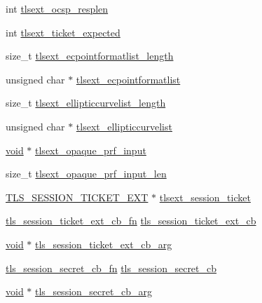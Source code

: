 \begin{DoxyCompactItemize}
\item 
int \hyperlink{structssl__st_a468160b672652db37243c0c954d9cfba}{tlsext\+\_\+ocsp\+\_\+resplen}
\item 
int \hyperlink{structssl__st_ade29ff7dfa991a7a99efa0964a1115cb}{tlsext\+\_\+ticket\+\_\+expected}
\item 
size\+\_\+t \hyperlink{structssl__st_ae7ba2dfb840d8ff09aea0b9d2ce00a9f}{tlsext\+\_\+ecpointformatlist\+\_\+length}
\item 
unsigned char $\ast$ \hyperlink{structssl__st_aed6a4a471306c6c96e1052966ed5b4cd}{tlsext\+\_\+ecpointformatlist}
\item 
size\+\_\+t \hyperlink{structssl__st_a51510574a1159a9fb5ab06bf323945c6}{tlsext\+\_\+ellipticcurvelist\+\_\+length}
\item 
unsigned char $\ast$ \hyperlink{structssl__st_afc8968e1fcae3767abbb9b981dc0ac75}{tlsext\+\_\+ellipticcurvelist}
\item 
\hyperlink{hw__4758__cca_8h_afad4d591c7931ff6dc5bf69c76c96aa0}{void} $\ast$ \hyperlink{structssl__st_afd231ed43f1d6f4332cb51822953a4d2}{tlsext\+\_\+opaque\+\_\+prf\+\_\+input}
\item 
size\+\_\+t \hyperlink{structssl__st_a27987f123cee6fffdea757aa42d25a3b}{tlsext\+\_\+opaque\+\_\+prf\+\_\+input\+\_\+len}
\item 
\hyperlink{include_2openssl_2ssl_8h_a6f21bcd57af48df2c3043423ec10f7d2}{T\+L\+S\+\_\+\+S\+E\+S\+S\+I\+O\+N\+\_\+\+T\+I\+C\+K\+E\+T\+\_\+\+E\+XT} $\ast$ \hyperlink{structssl__st_ae53787d2b20ae1891b51d7d6cc5ae547}{tlsext\+\_\+session\+\_\+ticket}
\item 
\hyperlink{ssl_2ssl_8h_a8682d624fb1a55e1b7b036538f5c988c}{tls\+\_\+session\+\_\+ticket\+\_\+ext\+\_\+cb\+\_\+fn} \hyperlink{structssl__st_ac213abae2e8bf738a7608f8d914cad45}{tls\+\_\+session\+\_\+ticket\+\_\+ext\+\_\+cb}
\item 
\hyperlink{hw__4758__cca_8h_afad4d591c7931ff6dc5bf69c76c96aa0}{void} $\ast$ \hyperlink{structssl__st_a12ff9a6e087f8ed66555114cab4e90fd}{tls\+\_\+session\+\_\+ticket\+\_\+ext\+\_\+cb\+\_\+arg}
\item 
\hyperlink{ssl_2ssl_8h_aca102e595fe3f74f0af8a21c4b40cdb5}{tls\+\_\+session\+\_\+secret\+\_\+cb\+\_\+fn} \hyperlink{structssl__st_a045784a81bac9f3c8ec585aaf3ad1a2c}{tls\+\_\+session\+\_\+secret\+\_\+cb}
\item 
\hyperlink{hw__4758__cca_8h_afad4d591c7931ff6dc5bf69c76c96aa0}{void} $\ast$ \hyperlink{structssl__st_a9548e9c706cea7a1617ef021d7669d17}{tls\+\_\+session\+\_\+secret\+\_\+cb\+\_\+arg}
\item 

\end{DoxyCompactItemize}
